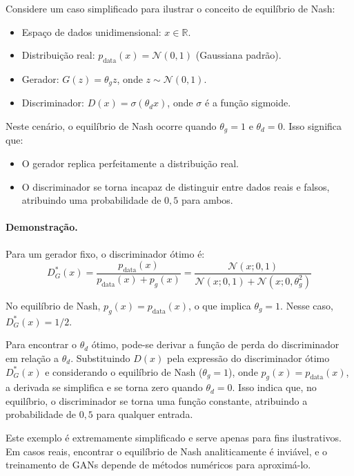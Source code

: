 \documentclass{tufte-handout}
\begin{document}
\begin{exmp}

Considere um caso simplificado para ilustrar o conceito de equilíbrio de Nash:
\begin{itemize}
    \item Espaço de dados unidimensional: $x \in \mathbb{R}$.
    \item Distribuição real: $p_{\text{data}}(x) = \mathcal{N}(0, 1)$ (Gaussiana padrão).
    \item Gerador: $G(z) = \theta_g z$, onde $z \sim \mathcal{N}(0, 1)$.
    \item Discriminador: $D(x) = \sigma(\theta_d x)$, onde $\sigma$ é a função sigmoide.
\end{itemize}

Neste cenário, o equilíbrio de Nash ocorre quando $\theta_g = 1$ e $\theta_d = 0$. Isso significa que:
\begin{itemize}
    \item O gerador replica perfeitamente a distribuição real.
    \item O discriminador se torna incapaz de distinguir entre dados reais e falsos, atribuindo uma probabilidade de $0,5$ para ambos.
\end{itemize}

\paragraph{Demonstração.}
Para um gerador fixo, o discriminador ótimo é:
\begin{equation}
D^*_G(x) = \frac{p_{\text{data}}(x)}{p_{\text{data}}(x) + p_g(x)} = \frac{\mathcal{N}(x; 0, 1)}{\mathcal{N}(x; 0, 1) + \mathcal{N}(x; 0, \theta_g^2)}
\end{equation}

No equilíbrio de Nash, $p_g(x) = p_{\text{data}}(x)$, o que implica $\theta_g = 1$. Nesse caso, $D^*_G(x) = 1/2$.

Para encontrar o $\theta_d$ ótimo, pode-se derivar a função de perda do discriminador em relação a $\theta_d$. Substituindo $D(x)$ pela expressão do discriminador ótimo $D^*_G(x)$ e considerando o equilíbrio de Nash ($\theta_g = 1$), onde $p_g(x) = p_{\text{data}}(x)$, a derivada se simplifica e se torna zero quando $\theta_d = 0$. Isso indica que, no equilíbrio, o discriminador se torna uma função constante, atribuindo a probabilidade de $0,5$ para qualquer entrada.

Este exemplo é extremamente simplificado e serve apenas para fins ilustrativos. Em casos reais, encontrar o equilíbrio de Nash analiticamente é inviável, e o treinamento de GANs depende de métodos numéricos para aproximá-lo.
\end{exmp}
\end{document}
